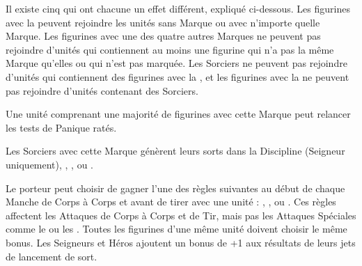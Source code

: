 \newcommand{\thumprule}{%
Choisissez une figurine en contact socle à socle avec le Géant dans l'unité sélectionnée. Cette figurine doit faire un test d'Initiative. Si elle échoue, la figurine subit 2D6 blessures avec la règle \armourpiercing{6}.
}

\newcommand{\smashrule}{%
Choisissez une figurine en contact socle à socle avec le Géant dans l'unité sélectionnée. Cette figurine subit une blessure avec la règle \armourpiercing{6}. Si la figurine n'a pas encore attaqué, elle ne peut plus le faire au cours de cette manche. Si la figurine a déjà réalisé ses attaques, elle ne pourra pas attaquer au cours du tour de  joueur à venir.
}



\newcommand{\QRSnote}{%
\noindent\refsymbol{} Un membre d'équipage de moins en tant que monture.
}












\startarmyspecialrules

\armyspecialruleentry{\marksofthedarkgods}

Il existe cinq \marksofthedarkgods{} qui ont chacune un effet différent, expliqué ci-dessous. Les figurines avec la \markoftruechaos{} peuvent rejoindre les unités sans Marque ou avec n'importe quelle Marque. Les figurines avec une des quatre autres Marques ne peuvent pas rejoindre d'unités qui contiennent au moins une figurine qui n'a pas la même Marque qu'elles ou qui n'est pas marquée. Les Sorciers ne peuvent pas rejoindre d'unités qui contiennent des figurines avec la \markofwrath{}, et les figurines avec la \markofwrath{} ne peuvent pas rejoindre d'unités contenant des Sorciers.

\spacebetweenmarks{}

\hfill\markstartsidetext{\markoftruechaos}
Une unité comprenant une majorité de figurines avec cette Marque peut relancer les tests de Panique ratés.

Les Sorciers avec cette Marque génèrent leurs sorts dans la Discipline \heavens{} (Seigneur uniquement), \alchemy{}, \fire{}, \death{} ou \shadows{}.
\markclosesidetext{}

\spacebetweenmarks{}

\markstartsidetext{\markofchange}
Le porteur peut choisir de gagner l'une des règles suivantes au début de chaque Manche de Corps à Corps et avant de tirer avec une unité : \divineattacks{}, \flamingattacks{}, \magicalattacks{} ou \hellfire{}. Ces règles affectent les Attaques de Corps à Corps et de Tir, mais pas les Attaques Spéciales comme le \stomp{} ou les \impacthits{}. Toutes les figurines d'une même unité doivent choisir le même bonus. Les Seigneurs et Héros ajoutent un bonus de +1 aux résultats de leurs jets de lancement de sort.

